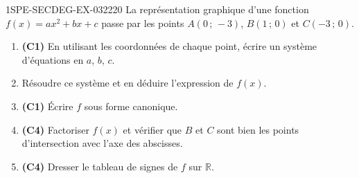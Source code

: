 \begin{exercice}{1SPE-SECDEG-EX-032}{2}{20}
La représentation graphique d'une fonction $f(x) = ax^2 + bx + c$ passe par les points $A(0\,;\,-3)$, $B(1\,;\,0)$ et $C(-3\,;\,0)$.

\begin{enumerate}
  \item \textbf{(C1)} En utilisant les coordonnées de chaque point, écrire un système d'équations en $a$, $b$, $c$.
  \item Résoudre ce système et en déduire l'expression de $f(x)$.
  \item \textbf{(C1)} Écrire $f$ sous forme canonique.
  \item \textbf{(C4)} Factoriser $f(x)$ et vérifier que $B$ et $C$ sont bien les points d'intersection avec l'axe des abscisses.
  \item \textbf{(C4)} Dresser le tableau de signes de $f$ sur $\mathbb{R}$.
\end{enumerate}
\end{exercice}
